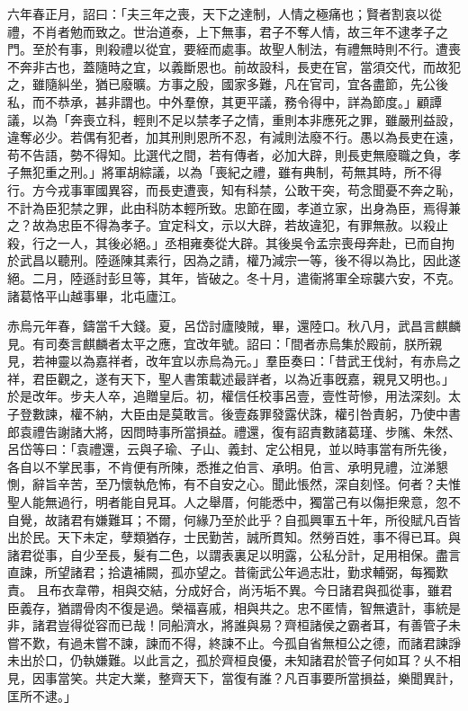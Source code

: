 \begin{pinyinscope}
 
 六年春正月，詔曰：「夫三年之喪，天下之達制，人情之極痛也；賢者割哀以從禮，不肖者勉而致之。世治道泰，上下無事，君子不奪人情，故三年不逮孝子之門。至於有事，則殺禮以從宜，要絰而處事。故聖人制法，有禮無時則不行。遭喪不奔非古也，蓋隨時之宜，以義斷恩也。前故設科，長吏在官，當須交代，而故犯之，雖隨糾坐，猶已廢曠。方事之殷，國家多難，凡在官司，宜各盡節，先公後私，而不恭承，甚非謂也。中外羣僚，其更平議，務令得中，詳為節度。」顧譚議，以為「奔喪立科，輕則不足以禁孝子之情，重則本非應死之罪，雖嚴刑益設，違奪必少。若偶有犯者，加其刑則恩所不忍，有減則法廢不行。愚以為長吏在遠，苟不告語，勢不得知。比選代之間，若有傳者，必加大辟，則長吏無廢職之負，孝子無犯重之刑。」將軍胡綜議，以為「喪紀之禮，雖有典制，苟無其時，所不得行。方今戎事軍國異容，而長吏遭喪，知有科禁，公敢干突，苟念聞憂不奔之恥，不計為臣犯禁之罪，此由科防本輕所致。忠節在國，孝道立家，出身為臣，焉得兼之？故為忠臣不得為孝子。宜定科文，示以大辟，若故違犯，有罪無赦。以殺止殺，行之一人，其後必絕。」丞相雍奏從大辟。其後吳令孟宗喪母奔赴，已而自拘於武昌以聽刑。陸遜陳其素行，因為之請，權乃減宗一等，後不得以為比，因此遂絕。二月，陸遜討彭旦等，其年，皆破之。冬十月，遣衞將軍全琮襲六安，不克。諸葛恪平山越事畢，北屯廬江。
 
 
赤烏元年春，鑄當千大錢。夏，呂岱討廬陵賊，畢，還陸口。秋八月，武昌言麒麟見。有司奏言麒麟者太平之應，宜改年號。詔曰：「間者赤烏集於殿前，朕所親見，若神靈以為嘉祥者，改年宜以赤烏為元。」羣臣奏曰：「昔武王伐紂，有赤烏之祥，君臣觀之，遂有天下，聖人書策載述最詳者，以為近事旣嘉，親見又明也。」於是改年。步夫人卒，追贈皇后。初，權信任校事呂壹，壹性苛慘，用法深刻。太子登數諫，權不納，大臣由是莫敢言。後壹姦罪發露伏誅，權引咎責躬，乃使中書郎袁禮告謝諸大將，因問時事所當損益。禮還，復有詔責數諸葛瑾、步隲、朱然、呂岱等曰：「袁禮還，云與子瑜、子山、義封、定公相見，並以時事當有所先後，各自以不掌民事，不肯便有所陳，悉推之伯言、承明。伯言、承明見禮，泣涕懇惻，辭旨辛苦，至乃懷執危怖，有不自安之心。聞此悵然，深自刻怪。何者？夫惟聖人能無過行，明者能自見耳。人之舉厝，何能悉中，獨當己有以傷拒衆意，忽不自覺，故諸君有嫌難耳；不爾，何緣乃至於此乎？自孤興軍五十年，所役賦凡百皆出於民。天下未定，孽類猶存，士民勤苦，誠所貫知。然勞百姓，事不得已耳。與諸君從事，自少至長，髮有二色，以謂表裏足以明露，公私分計，足用相保。盡言直諫，所望諸君；拾遺補闕，孤亦望之。昔衞武公年過志壯，勤求輔弼，每獨歎責。
 且布衣韋帶，相與交結，分成好合，尚汚垢不異。今日諸君與孤從事，雖君臣義存，猶謂骨肉不復是過。榮福喜戚，相與共之。忠不匿情，智無遺計，事統是非，諸君豈得從容而已哉！同船濟水，將誰與易？齊桓諸侯之霸者耳，有善管子未嘗不歎，有過未嘗不諫，諫而不得，終諫不止。今孤自省無桓公之德，而諸君諫諍未出於口，仍執嫌難。以此言之，孤於齊桓良優，未知諸君於管子何如耳？乆不相見，因事當笑。共定大業，整齊天下，當復有誰？凡百事要所當損益，樂聞異計，匡所不逮。」
 

\end{pinyinscope}
